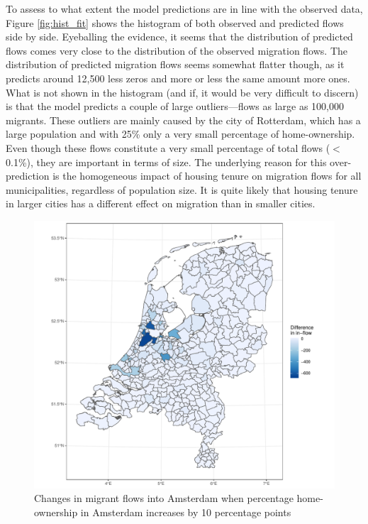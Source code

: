 \documentclass[fleqn,10pt]{SelfArx} %
\begin{document}
{{To assess to what extent the model predictions are in line with the observed
data, Figure \ref{fig:hist_fit} shows the histogram of both observed and
predicted flows side by side. Eyeballing the evidence, it seems that the
distribution of predicted flows comes very close to the distribution of the
observed migration flows. The distribution of predicted migration flows seems
somewhat flatter though, as it predicts around 12,500 less zeros and more or
less the same amount more ones. What is not shown in the histogram (and if, it
would be very difficult to discern) is that the model predicts a couple of large
outliers---flows as large as 100,000 migrants. These outliers are mainly caused
by the city of Rotterdam, which has a large population and with 25\% only a very
small percentage of home-ownership. Even though these flows constitute a very
small percentage of total flows ($<$ 0.1\%), they are important in terms of
size. The underlying reason for this over-prediction is the homogeneous impact
of housing tenure on migration flows for all municipalities, regardless of
population size. It is quite likely that housing tenure in larger cities has a
different effect on migration than in smaller cities.

\begin{figure}
	\centering \includegraphics[width =
	\columnwidth]{../fig/p_diff_in.pdf}
	\caption{Changes in migrant flows into Amsterdam when percentage home-ownership
		in Amsterdam increases by 10 percentage points}\label{fig:diff_in}
\end{figure}

}}
\end{document}

